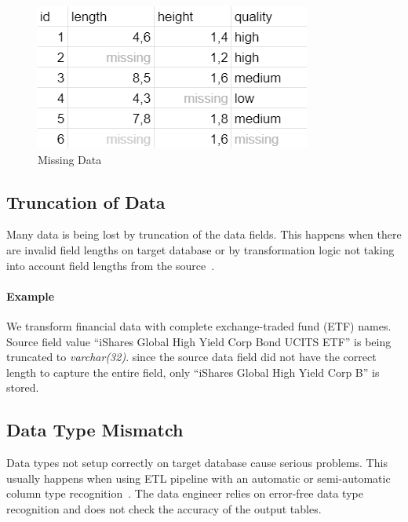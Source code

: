 \begin{figure}[htb]
    \centering
    \includegraphics[width=.5\textwidth]{figures/missing-data.png}
    \caption{Missing Data}
    \label{fig:missing-data}
\end{figure}
\FloatBarrier

\subsection*{Truncation of Data}

Many data is being lost by truncation of the data fields.
This happens when there are invalid field lengths on target database or by transformation logic not taking into account field lengths from the source~\cite{web:common-defects}.

\paragraph*{Example} We transform financial data with complete exchange-traded fund (ETF) names.
Source field value \enquote{iShares Global High Yield Corp Bond UCITS ETF} is being truncated to \textit{varchar(32)}.
since the source data field did not have the correct length to capture the entire field, only \enquote{iShares Global High Yield Corp B} is stored.


\subsection*{Data Type Mismatch}

Data types not setup correctly on target database cause serious problems.
This usually happens when using ETL pipeline with an automatic or semi-automatic column type recognition~\cite{web:common-defects}.
The data engineer relies on error-free data type recognition and does not check the accuracy of the output tables.

